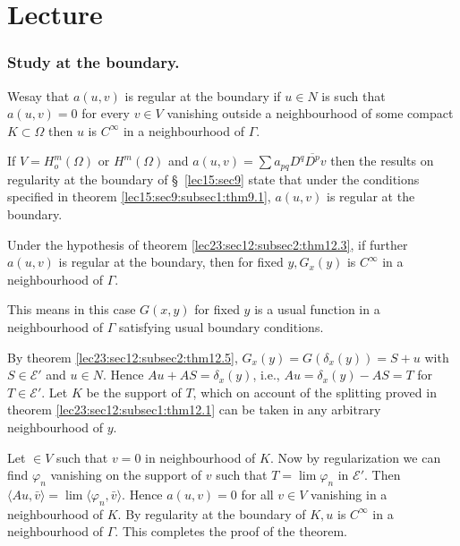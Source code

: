 
\chapter{Lecture}\label{lec24}%

\setcounter{section}{12}
\subsection{Study at the boundary.}\label{lec24:sec12:subsec3}

\begin{definition}\label{lec24:sec12:subsec3:def12.6}%
  We\pageoriginale say that $a(u, v)$ is regular at the boundary if $u \in N$
  is such that $a(u, v) = 0$ for every $v \in V$ vanishing
  outside a neighbourhood of some compact $K \subset \Omega$ then $u$ is
  $C^\infty$ in a neighbourhood of $\Gamma$. 
\end{definition}

If $V = H^m_o (\Omega)$ or $H^m (\Omega)$ and $a(u, v) = \sum a_{pq}
D^q \overline{D^p}v$ then the results on regularity at the boundary of
\S\ \ref{lec15:sec9} state that under the conditions specified in theorem \ref{lec15:sec9:subsec1:thm9.1}, $a(u, v)$ is regular at the boundary. 

\begin{theorem}\label{lec24:sec12:subsec3:thm12.6}%
  Under the hypothesis of theorem \ref{lec23:sec12:subsec2:thm12.3}, if further $a(u, v)$ is regular
  at the boundary, then for fixed $y, G_x(y)$ is $C^\infty$ in a
  neighbourhood of $\Gamma$. 
\end{theorem}

This means in this case $G(x, y)$ for fixed $y$ is a usual function in
a neighbourhood of $\Gamma$ satisfying usual boundary conditions. 

By theorem \ref{lec23:sec12:subsec2:thm12.5}, $G_x (y) = G(\delta_x (y)) = S + u$ with $S
\in \mathscr{E'}$ and $u \in N$. Hence $Au + AS =
\delta_x (y)$, i.e., $Au = \delta_x (y) - AS = T$ for $T \in
\mathscr{E'}$. Let $K$ be the support of $T$, which on account of the
splitting proved in theorem \ref{lec23:sec12:subsec1:thm12.1} can be taken in any arbitrary
neighbourhood of $y$.  

Let $\in V$ such that $v = 0$ in neighbourhood of $K$. Now by
regularization we can find $\varphi_n$ vanishing on the support of $v$
such that $T = \lim \varphi_n $ in $\mathscr{E'}$. Then $\langle Au,
\bar{v} \rangle = \lim \langle \varphi_n, \bar{v} \rangle$. Hence $ a(u, v) = 0$ for all  $v \in V$    
vanishing in a neighbourhood of $K$. By regularity at the boundary of
$K, u$ is $C^\infty$ in a neighbourhood of $\Gamma$. This completes
the proof of the theorem. 

